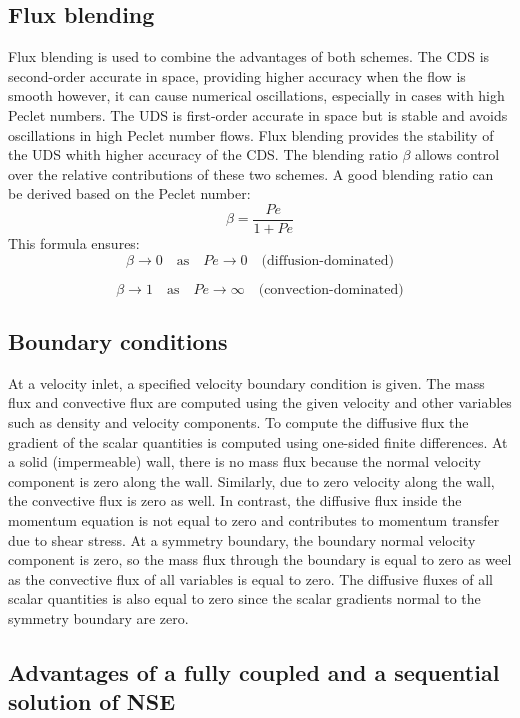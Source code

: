 \documentclass{article}
\begin{document}
\subsection{Flux blending}

Flux blending is used to combine the advantages of both schemes. The CDS is second-order accurate in space, providing higher accuracy when the
flow is smooth however, it can cause numerical oscillations, especially in cases with high Peclet numbers. The UDS is first-order 
accurate in space but is stable and avoids oscillations in high Peclet number flows. Flux blending provides the stability of the UDS whith higher 
accuracy of the CDS. The blending ratio $\beta$ allows control over the relative contributions of these two schemes. A good blending ratio can be derived 
based on the Peclet number:
\[
\beta = \frac{Pe}{1 + Pe}
\]
This formula ensures:
\[
\beta \to 0 \quad \text{as} \quad Pe \to 0 \quad \text{(diffusion-dominated)}
\]

\[
\beta \to 1 \quad \text{as} \quad Pe \to \infty \quad \text{(convection-dominated)}
\]

\subsection{Boundary conditions}

At a velocity inlet, a specified velocity boundary condition is given. The mass flux and convective flux are computed using the given velocity 
and other variables such as density and velocity components. To compute the diffusive flux the gradient of the scalar quantities is computed using
one-sided finite differences. At a solid (impermeable) wall, there is no mass flux because the normal velocity component is zero along the wall. 
Similarly, due to zero velocity along the wall, the convective flux is zero as well. In contrast, the diffusive flux inside the momentum equation 
is not equal to zero and contributes to momentum transfer due to shear stress. At a symmetry boundary, the boundary normal velocity component is zero,
so the mass flux through the boundary is equal to zero as weel as the convective flux of all variables is equal to zero. The diffusive fluxes
of all scalar quantities is also equal to zero since the scalar gradients normal to the symmetry boundary are zero.

\subsection{Advantages of a fully coupled and a sequential solution of NSE}
\end{document}
